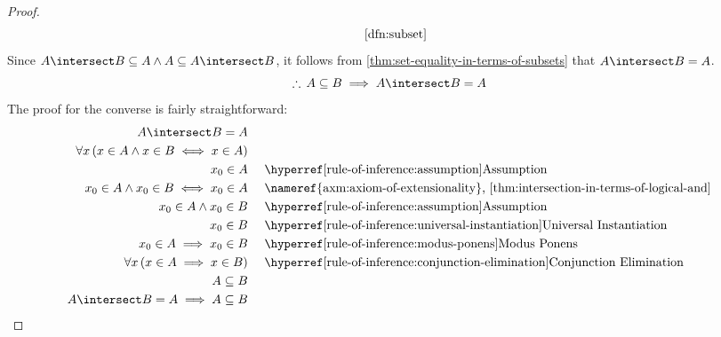 \begin{proof}
\begin{equation*}
\begin{aligned}
            &\quad\text{\cref{dfn:subset}}\\
        \end{aligned}
    \end{equation*}
    Since \( A \intersect B \subseteq A \land A \subseteq A \intersect B \),
    it follows from \cref{thm:set-equality-in-terms-of-subsets} that
    \( A \intersect B = A \).
    \begin{equation}
        \label{eq:A-subset-B-implies-A-intersect-B-equals-A}
        \therefore \, A \subseteq B \implies A \intersect B = A
    \end{equation}
    The proof for the converse is fairly straightforward:
    \begin{equation*}
        \begin{aligned}
            A \intersect B = A& \\
            \forall x \, \mleft( x \in A \land x \in B \iff x \in A \mright)& \\
            x_{0} \in A& \\
            x_{0} \in A \land x_{0} \in B \iff x_{0} \in A& \\
            x_{0} \in A \land x_{0} \in B& \\
            x_{0} \in B& \\
            x_{0} \in A \implies x_{0} \in B& \\
            \forall x \, \mleft( x \in A \implies x \in B \mright)& \\
            A \subseteq B&\\
            A \intersect B = A \implies A \subseteq B& \\
        \end{aligned}
        \text{  }
        \begin{aligned}
            &\quad\text{\aref{rule-of-inference:assumption}{Assumption}}\\
            &\quad\text{\nameref{axm:axiom-of-extensionality}, \cref{thm:intersection-in-terms-of-logical-and}}\\
            &\quad\text{\aref{rule-of-inference:assumption}{Assumption}}\\
            &\quad\text{\aref{rule-of-inference:universal-instantiation}{Universal Instantiation}}\\
            &\quad\text{\aref{rule-of-inference:modus-ponens}{Modus Ponens}}\\
            &\quad\text{\aref{rule-of-inference:conjunction-elimination}{Conjunction Elimination}}\\

\end{aligned}
\end{equation*}
\end{proof}
